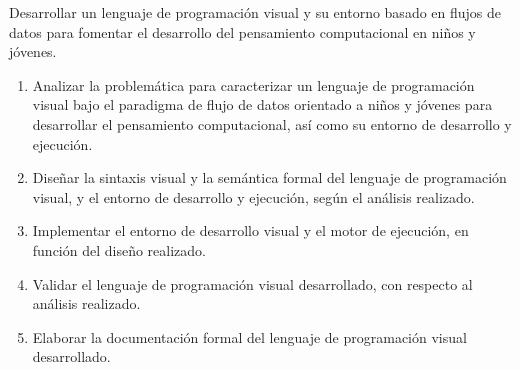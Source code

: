 
Desarrollar un lenguaje de programación visual y su entorno basado en flujos de datos para fomentar el desarrollo del pensamiento computacional en niños y jóvenes.


\newcommand{\oeOne}{Analizar la problemática para caracterizar un lenguaje de programación visual bajo el paradigma de flujo de datos orientado a niños y jóvenes para desarrollar el pensamiento computacional, así como su entorno de desarrollo y ejecución.}
\newcommand{\oeTwo}{Diseñar la sintaxis visual y la semántica formal del lenguaje de programación visual, y el entorno de desarrollo y ejecución, según el análisis realizado.}
\newcommand{\oeThree}{Implementar el entorno de desarrollo visual y el motor de ejecución, en función del diseño realizado.}
\newcommand{\oeFour}{Validar el lenguaje de programación visual desarrollado, con respecto al análisis realizado.}
\newcommand{\oeFive}{Elaborar la documentación formal del lenguaje de programación visual desarrollado.}
\begin{enumerate}
  \item \oeOne
  \item \oeTwo
  \item \oeThree
  \item \oeFour
  \item \oeFive
\end{enumerate}

\clearpage
